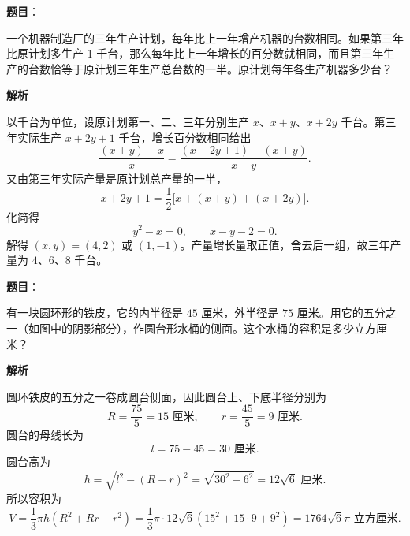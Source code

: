 \begin{answer}

\textbf{题目}：

一个机器制造厂的三年生产计划，每年比上一年增产机器的台数相同。如果第三年比原计划多生产 1 千台，那么每年比上一年增长的百分数就相同，而且第三年生产的台数恰等于原计划三年生产总台数的一半。原计划每年各生产机器多少台？

\textbf{解析}

以千台为单位，设原计划第一、二、三年分别生产 $x$、$x+y$、$x+2y$ 千台。第三年实际生产 $x+2y+1$ 千台，增长百分数相同给出
\[
\frac{(x+y)-x}{x}
=\frac{(x+2y+1)-(x+y)}{x+y}.
\]
又由第三年实际产量是原计划总产量的一半，
\[
x+2y+1=\frac12\bigl[x+(x+y)+(x+2y)\bigr].
\]
化简得
\[
y^2-x=0,
\qquad x-y-2=0.
\]
解得 $(x,y)=(4,2)$ 或 $(1,-1)$。产量增长量取正值，舍去后一组，故三年产量为 $4$、$6$、$8$ 千台。


\end{answer}
\begin{answer}

\textbf{题目}：

有一块圆环形的铁皮，它的内半径是 $45$ 厘米，外半径是 $75$ 厘米。用它的五分之一（如图中的阴影部分），作圆台形水桶的侧面。这个水桶的容积是多少立方厘米？
\nopagebreak[4]
\begin{center}\end{center}
\nopagebreak[4]
\textbf{解析}

圆环铁皮的五分之一卷成圆台侧面，因此圆台上、下底半径分别为
\[
R=\frac{75}{5}=15\text{ 厘米},
\qquad r=\frac{45}{5}=9\text{ 厘米}.
\]
圆台的母线长为
\[
l=75-45=30\text{ 厘米}.
\]
圆台高为
\[
h=\sqrt{l^2-(R-r)^2}
=\sqrt{30^2-6^2}=12\sqrt6\text{ 厘米}.
\]
所以容积为
\[
V=\frac13\pi h(R^2+Rr+r^2)
=\frac13\pi\cdot12\sqrt6(15^2+15\cdot9+9^2)
=1764\sqrt6\pi\text{ 立方厘米}.
\]


\end{answer}
